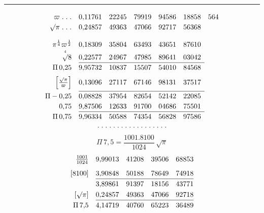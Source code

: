 \begin{center}\rule{.22\linewidth}{.4pt}\end{center}
\[\renewcommand{\arraystretch}{1.2}\begin{array}{@{}r@{\quad}rrrrrr@{}}
\varpi\;{.}\;{.}\;{.}&0{,}11761&22245&79919&94586&18858&564\\
\surd\pi\;{.}\;{.}\;{.}&0{,}24857&49363&47066&92717&56368&\\[1em]
\pi^{\frac14}\varpi^{\frac12}&0{,}18309&35804&63493&43651&87610&\\
\overset{\scriptscriptstyle4}{\surd}8&0{,}22577&24967&47985&89641&03042&\\ \cline{2-6}
\Pi\,0{,}25&9{,}95732&10837&15507&54010&84568&\\[.5em]
\left[\frac{\surd\pi}{\varpi}\right]&0{,}13096&27117&67146&98131&37517&\\[.5em] \cline{2-6}
\Pi-0{,}25&0{,}08828&37954&82654&52142&22085&\\
0{,}75&9{,}87506&12633&91700&04686&75501&\\ \cline{2-6}
\Pi\,0{,}75&9{,}96334&50588&74354&56828&97586&
\end{array}\]
\[ {.}\;{.}\;{.}\;{.}\;{.}\;{.}\;{.}\;{.}\;{.}\;{.}\;{.}\;{.}\;{.}\;{.}\;{.}\;{.}\;{.}\;{.} \]
\par\bigskip\noindent{\small[S. 247]}\par
\[\Pi\,7{,}5=\frac{1001{.}8100}{1024}\,\surd\pi\]
\[\renewcommand{\arraystretch}{1.25}\begin{array}{@{}r@{\quad}rrrr@{}}
\frac{1001}{1024}&9{,}99013&41208&39506&68853\\[.5em]
{}[8100]&3{,}90848&50188&78649&74918\\ \cline{2-5}
&3{,}89861&91397&18156&43771\\
{}[\surd\pi]&0{,}24857&49363&47066&92718\\ \cline{2-5}
\Pi\,7{,}5&4{,}14719&40760&65223&36489
\end{array}\]
\clearpage{}
\endgroup

